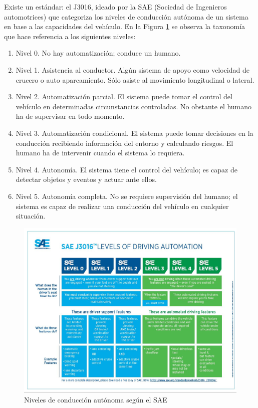 Existe un estándar: el J3016, ideado por la SAE (Sociedad de Ingenieros automotrices) que categoriza los niveles de conducción autónoma de un sistema en base a las capacidades del vehículo. En la Figura \ref{fig:levelsdriving} se observa la taxonomía que hace referencia a los siguientes niveles:

\begin{enumerate}
    \item Nivel 0. No hay automatización; conduce un humano.
    \item Nivel 1. Asistencia al conductor. Algún sistema de apoyo como velocidad de crucero o auto aparcamiento. Sólo asiste al movimiento longitudinal o lateral.
    \item Nivel 2. Automatización parcial. El sistema puede tomar el control del vehículo en determinadas circunstancias controladas. No obstante el humano ha de supervisar en todo momento.
    \item Nivel 3. Automatización condicional. El sistema puede tomar decisiones en la conducción recibiendo información del entorno y calculando riesgos. El humano ha de intervenir cuando el sistema lo requiera.
    \item Nivel 4. Autonomía. El sistema tiene el control del vehículo; es capaz de detectar objetos y eventos y actuar ante ellos. 
    \item Nivel 5. Autonomía completa. No se requiere supervisión del humano; el sistema es capaz de realizar una conducción del vehículo en cualquier situación.
\end{enumerate}

\begin{figure}
  \centering
  \includegraphics[width=.9\linewidth]{img/levels-of-driving}
  \caption{Niveles de conducción autónoma según el SAE}
  \label{fig:levelsdriving}
\end{figure}

